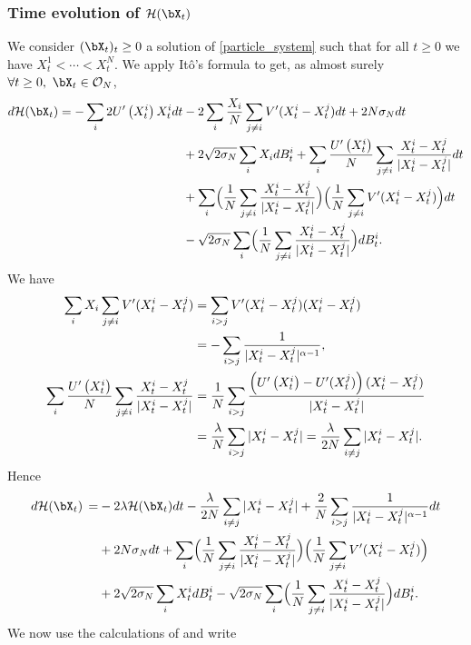 \subsubsection*{Time evolution of $\mathcal{H}(\bX_t)$} We consider $(\bX_t)_t\geq0$ a solution of \eqref{particle_system} such that for all $t\geq0$ we have $X^1_t<\cdots<X^N_t$. We apply Itô's formula to get, as almost surely ${\forall t\geq0,\ \bX_t\in\mathcal{O}_N}$,
\begin{align*}
d\mathcal{H}(\bX_t)=-\sum_{i}2U'\left(X^i_t\right)X^i_tdt&-2\sum_i\frac{X_i}{N}\sum_{j\neq i}V'(X^i_t-X^j_t)dt+2N\sigma_Ndt\\
&+2\sqrt{2\sigma_N}\sum_iX_idB^i_t+\sum_i\frac{U'\left(X^i_t\right)}{N}\sum_{j\neq i}\frac{X^i_t-X^j_t}{|X^i_t-X^j_t|}dt\\
&+\sum_i\Bigl(\frac{1}{N}\sum_{j\neq i}\frac{X^i_t-X^j_t}{|X^i_t-X^j_t|}\Bigr)\Bigl(\frac{1}{N}\sum_{j\neq i}V'(X^i_t-X^j_t)\Bigr)dt\\
&-\sqrt{2\sigma_N}\sum_i\Bigl(\frac{1}{N}\sum_{j\neq i}\frac{X^i_t-X^j_t}{|X^i_t-X^j_t|}\Bigl)dB^i_t.
\end{align*}
We have
\begin{align}
\sum_iX_i\sum_{j\neq i}V'(X^i_t-X^j_t)&=\sum_{i>j}V'(X^i_t-X^j_t)(X^i_t-X^j_t)\notag\\
&=-\sum_{i>j}\frac{1}{|X^i_t-X^j_t|^{\alpha-1}},\notag\\
\label{eq:modif_conv}
\sum_i\frac{U'\left(X^i_t\right)}{N}\sum_{j\neq i}\frac{X^i_t-X^j_t}{|X^i_t-X^j_t|}&=\frac{1}{N}\sum_{i>j}\frac{\left(U'\left(X^i_t\right)-U'(X^j_t)\right)(X^i_t-X^j_t)}{|X^i_t-X^j_t|}\\
&=\frac{\lambda}{N}\sum_{i>j}|X^i_t-X^j_t|=\frac{\lambda}{2N}\sum_{i\neq j}|X^i_t-X^j_t|.\notag
\end{align}
Hence
\begin{align*}
d\mathcal{H}(\bX_t)\,=&-2\lambda \mathcal{H}(\bX_t)dt-\frac{\lambda}{2N}\sum_{i\neq j}|X^i_t-X^j_t|+\frac{2}{N}\sum_{i>j}\frac{1}{|X^i_t-X^j_t|^{\alpha-1}}dt\\
&+2N\sigma_Ndt+\sum_i\Bigl(\frac{1}{N}\sum_{j\neq i}\frac{X^i_t-X^j_t}{|X^i_t-X^j_t|}\Bigr)\Bigl(\frac{1}{N}\sum_{j\neq i}V'(X^i_t-X^j_t)\Bigr)\\
&+2\sqrt{2\sigma_N}\sum_iX^i_tdB^i_t-\sqrt{2\sigma_N}\sum_i\Bigl(\frac{1}{N}\sum_{j\neq i}\frac{X^i_t-X^j_t}{|X^i_t-X^j_t|}\Bigr)dB^i_t.
\end{align*}
We now use the calculations of \cite[Lem.\,4.2]{lu_mattingly} and write
